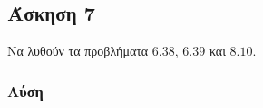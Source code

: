 \newpage \subsection*{Άσκηση 7}

Να λυθούν τα προβλήματα $6.38$, $6.39$ και $8.10$.

\subsubsection*{Λύση}

\inputminted{verilog}{./ex7/638.v}

